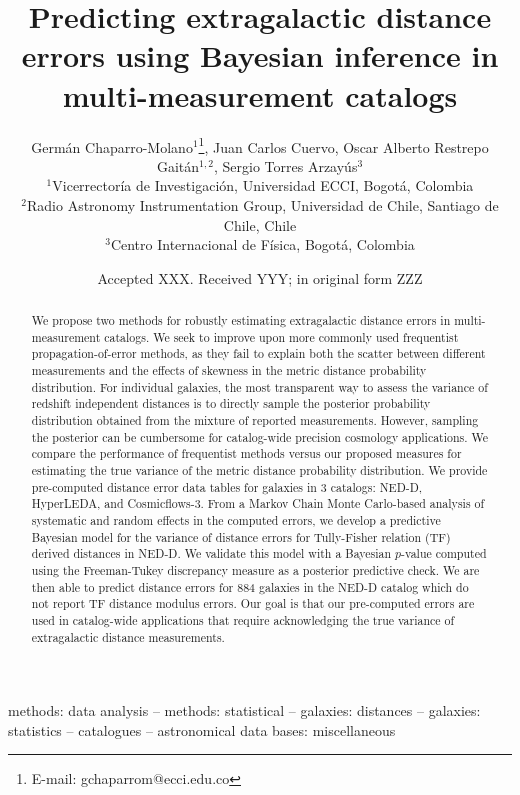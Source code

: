 \documentclass[a4paper,fleqn,usenatbib]{mnras}
\title[Predicting extragalactic distance errors]{Predicting extragalactic distance errors using Bayesian inference in multi-measurement catalogs}
\author[G. Chaparro-Molano et al.]{Germ\'an Chaparro-Molano$^{1}$\thanks{E-mail: gchaparrom@ecci.edu.co},
Juan Carlos Cuervo,
Oscar Alberto Restrepo Gait\'an$^{1,2}$, \newauthor
Sergio Torres Arzay\'{u}s$^{3}$
\\
$^{1}$Vicerrector\'ia de Investigaci\'on, Universidad ECCI, Bogot\'a, Colombia\\
$^{2}$Radio Astronomy Instrumentation Group, Universidad de Chile, Santiago de Chile, Chile\\
$^{3}$Centro Internacional de F\'isica, Bogot\'a, Colombia
}
\date{Accepted XXX. Received YYY; in original form ZZZ}
\begin{document}
\label{firstpage}
\pagerange{\pageref{firstpage}--\pageref{lastpage}}
\maketitle

\begin{abstract}
We propose two methods for robustly estimating extragalactic distance errors in multi-measurement catalogs. We seek to improve upon more commonly used frequentist propagation-of-error methods, as they fail to explain both the scatter between different measurements and the effects of skewness in the metric distance probability distribution. For individual galaxies, the most transparent way to assess the variance of redshift independent distances is to directly sample the posterior probability distribution obtained from the mixture of reported measurements. However, sampling the posterior can be cumbersome for catalog-wide precision cosmology applications. We compare the performance of frequentist methods versus our proposed measures for estimating the true variance of the metric distance probability distribution. We provide pre-computed distance error data tables for galaxies in 3 catalogs: NED-D, HyperLEDA, and Cosmicflows-3. From a Markov Chain Monte Carlo-based analysis of systematic and random effects in the computed errors, we develop a predictive Bayesian model for the variance of distance errors for Tully-Fisher relation (TF) derived distances in NED-D. We validate this model with a Bayesian $p$-value computed using the Freeman-Tukey discrepancy measure as a posterior predictive check. We are then able to predict distance errors for 884 galaxies in the NED-D catalog which do not report TF distance modulus errors. Our goal is that our pre-computed errors are used in catalog-wide applications that require acknowledging the true variance of extragalactic distance measurements.
\end{abstract}

\begin{keywords}
methods: data analysis -- methods: statistical -- galaxies: distances -- galaxies: statistics -- catalogues -- astronomical data bases: miscellaneous
\end{keywords}


\end{document}
